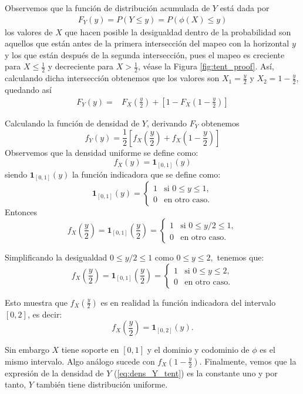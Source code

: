 \documentclass[../Main.tex]{subfiles}
\begin{document}
\begin{demostracion}{}{}
Observemos que la función de distribución acumulada de $Y$ está dada por \begin{align*}
    F_Y(y)=P(Y\leq y)=P(\phi(X)\leq y)
\end{align*}
los valores de $X$ que hacen posible la desigualdad dentro de la probabilidad son aquellos que están antes de la primera intersección del mapeo con la horizontal $y$ y los que están después de la segunda intersección, pues el mapeo es creciente para $X\leq \frac{1}{2}$ y decreciente para $X>\frac{1}{2}$, véase la Figura \ref{fig:tent_proof}. Así, calculando dicha intersección obtenemos que los valores son $X_1=\frac{y}{2}$ y $X_2=1-\frac{y}{2}$, quedando así 
\begin{align*}
    F_Y(y)=&F_X\left(\frac{y}{2}\right)+\left[1-F_X\left(1-\frac{y}{2}\right)\right]
\end{align*}

Calculando la función de densidad de $Y$, derivando $F_Y$ obtenemos 
\begin{equation}
    f_Y(y)=\frac{1}{2}\left[f_X\left(\frac{y}{2}\right)+f_X\left(1-\frac{y}{2}\right)\right]
    \label{eq:dens_Y_tent}
\end{equation}
Observemos que la densidad uniforme se define como:
\[f_X(y)=\mathbf{1}_{[0,1]}(y)\] siendo \(\mathbf{1}_{[0,1]}(y)\) la función indicadora que se define como:
\[
\mathbf{1}_{[0,1]}(y) = 
\begin{cases}
1 & \text{si } 0 \leq y \leq 1, \\
0 & \text{en otro caso}.
\end{cases}
\]
Entonces \[f_X\left(\frac{y}{2}\right)=\mathbf{1}_{[0,1]}\left(\frac{y}{2}\right)=
\begin{cases}
1 & \text{si } 0 \leq y/2 \leq 1, \\
0 & \text{en otro caso}.
\end{cases}\]


Simplificando la desigualdad \(0 \leq y/2 \leq 1\) como \(
0 \leq y \leq 2,
\)
tenemos que:
\[
f_X\left(\frac{y}{2}\right)=\mathbf{1}_{[0,1]}\left(\frac{y}{2}\right) = 
\begin{cases}
1 & \text{si } 0 \leq y \leq 2, \\
0 & \text{en otro caso}.
\end{cases}
\]

Esto muestra que $f_X\left(\frac{y}{2}\right)$ es en realidad la función indicadora del intervalo \([0,2]\), es decir:
\[
f_X\left(\frac{y}{2}\right) = \mathbf{1}_{[0,2]}(y).
\]

Sin embargo $X$ tiene soporte en $[0,1]$ y el dominio y codominio de $\phi$ es el mismo intervalo. Algo análogo sucede con $f_X\left(1-\frac{y}{2}\right)$. Finalmente, vemos que la expresión de la densidad de $Y$ (\ref{eq:dens_Y_tent}) es la constante uno y por tanto, $Y$ también tiene distribución uniforme. 
\end{demostracion}
\end{document}
